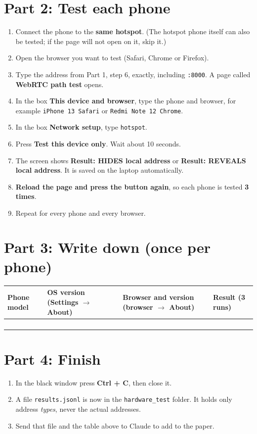 \documentclass[11pt,a4paper]{article}
\begin{document}
\section*{Part 2: Test each phone}
\begin{enumerate}
\item Connect the phone to the \textbf{same hotspot}. (The hotspot phone itself can also be tested; if the page will not open on it, skip it.)
\item Open the browser you want to test (Safari, Chrome or Firefox).
\item Type the address from Part 1, step 6, exactly, including \texttt{:8000}. A page called \textbf{WebRTC path test} opens.
\item In the box \textbf{This device and browser}, type the phone and browser, for example \texttt{iPhone 13 Safari} or \texttt{Redmi Note 12 Chrome}.
\item In the box \textbf{Network setup}, type \texttt{hotspot}.
\item Press \textbf{Test this device only}. Wait about 10 seconds.
\item The screen shows \textbf{Result: HIDES local address} or \textbf{Result: REVEALS local address}. It is saved on the laptop automatically.
\item \textbf{Reload the page and press the button again}, so each phone is tested \textbf{3 times}.
\item Repeat for every phone and every browser.
\end{enumerate}

\section*{Part 3: Write down (once per phone)}
\begin{tabularx}{\textwidth}{@{}YYYY@{}}
\toprule
\textbf{Phone model} & \textbf{OS version} (Settings $\rightarrow$ About) & \textbf{Browser and version} (browser $\rightarrow$ About) & \textbf{Result (3 runs)} \\
\midrule
 & & & \\[14pt]
 & & & \\[14pt]
 & & & \\[14pt]
 & & & \\[14pt]
\bottomrule
\end{tabularx}

\section*{Part 4: Finish}
\begin{enumerate}
\item In the black window press \textbf{Ctrl + C}, then close it.
\item A file \texttt{results.jsonl} is now in the \texttt{hardware\_test} folder. It holds only address \emph{types}, never the actual addresses.
\item Send that file and the table above to Claude to add to the paper.
\end{enumerate}
\end{document}
